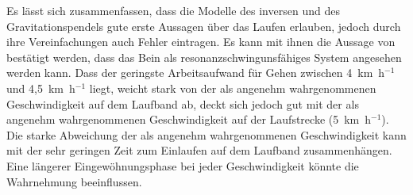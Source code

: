 Es lässt sich zusammenfassen, dass die Modelle des inversen und des Gravitationspendels gute erste Aussagen über das Laufen erlauben, jedoch durch ihre Vereinfachungen auch Fehler eintragen. Es kann mit ihnen die Aussage von \textcite{witte1992mechanische} bestätigt werden, dass das Bein als resonanzschwingunsfähiges System angesehen werden kann. Dass der geringste Arbeitsaufwand für Gehen zwischen 4~km~h$^{-1}$ \parencite{cavagna1976sources} und 4,5~km~h$^{-1}$ \parencite{cavagna2000role} liegt, weicht stark von der als angenehm wahrgenommenen Geschwindigkeit auf dem Laufband ab, deckt sich jedoch gut mit der als angenehm wahrgenommenen Geschwindigkeit auf der Laufstrecke (5~km~h$^{-1}$). Die starke Abweichung der als angenehm wahrgenommenen Geschwindigkeit kann mit der sehr geringen Zeit zum Einlaufen auf dem Laufband zusammenhängen. Eine längerer Eingewöhnungsphase bei jeder Geschwindigkeit könnte die Wahrnehmung beeinflussen.

